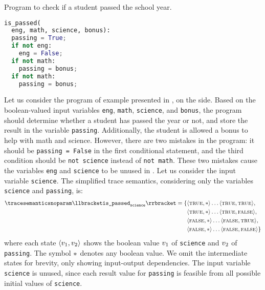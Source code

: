 \begin{example}
\begin{marginlisting}
  \caption{Program to check if a student passed the school year.}
  \vspace{2\lineheight}
\begin{lstlisting}[language=Python]
is_passed(
  eng, math, science, bonus):
  passing = True;
  if not eng:
    eng = False;
  if not math:
    passing = bonus;
  if not math:
    passing = bonus;
\end{lstlisting}
\end{marginlisting}
Let us consider the program of example presented in \textcite{Urban2018}, on the side.
Based on the boolean-valued input variables \texttt{eng}, \texttt{math}, \texttt{science}, and \texttt{bonus}, the program should determine whether a student has passed the year or not, and store the result in the variable \texttt{passing}. Additionally, the student is allowed a bonus to help with math and science.
However, there are two mistakes in the program: it should be \texttt{passing = False} in the first conditional statement, and the third condition should be \texttt{not science} instead of \texttt{not math}.
These two mistakes cause the variables \texttt{eng} and \texttt{science} to be unused in .
Let us consider the input variable \texttt{science}.
The simplified trace semantics, considering only the variables \texttt{science} and \texttt{passing}, is:
\begin{align*}
  \tracesemanticsnoparam\semanticsof{\texttt{is\_passed}_\texttt{science}}
  =
  \{
    &\tuple\true\anyvalue\dots\tuple\true\true, \\
    &\tuple\true\anyvalue\dots\tuple\true\false, \\
    &\tuple\false\anyvalue\dots\tuple\false\true, \\
    &\tuple\false\anyvalue\dots\tuple\false\false
  \}
\end{align*}
where each state $\langle v_1, v_2 \rangle$ shows the boolean value $v_1$ of \texttt{science} and $v_2$ of \texttt{passing}. The symbol ${*}$ denotes any boolean value. We omit the intermediate states for brevity, only showing input-output dependencies.
The input variable \texttt{science} is unused, since each result value for \texttt{passing} is feasible from all possible initial values of \texttt{science}.


\end{example}
